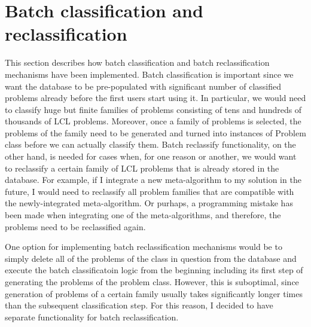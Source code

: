 


  
  


\section{Batch classification and reclassification}

This section describes how batch classification and
batch reclassification mechanisms have been implemented.
Batch classification is important since we want the database
to be pre-populated with significant number of classified
problems already before the first users start using it.
In particular, we would need to classify huge but finite
families of problems consisting of tens and hundreds of
thousands of LCL problems. Moreover, once a family of
problems is selected, the problems of the family need to
be generated and turned into instances of Problem class before
we can actually classify them. Batch reclassify functionality,
on the other hand, is needed for cases when, for one reason
or another, we would want to reclassify a certain
family of LCL problems that is already stored in the
database. For example, if I integrate a new meta-algorithm
to my solution in the future, I would need to reclassify
all problem families that are compatible with the newly-integrated
meta-algorithm. Or purhaps, a programming mistake has been
made when integrating one of the meta-algorithms, and therefore,
the problems need to be reclassified again.

One option for implementing batch reclassification
mechanisms would be to simply delete all of the problems
of the class in question from the database and execute
the batch classificatoin logic from the beginning
including its first step of generating the problems
of the problem class. However, this is suboptimal,
since generation of problems of a certain family
usually takes significantly longer times than
the subsequent classification step. For this reason,
I decided to have separate functionality for
batch reclassification.

